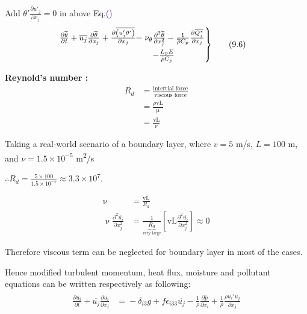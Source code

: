\documentclass[fleqn,10pt]{SelfArx} %
\newcommand{\myeqref}[1]{Eq.\textcolor{blue}{\textup{(\getrefnumber{#1})}}}
\begin{document}
Add $\overline{\theta'\frac{\partial u'_j}{\partial x_j}}=0$ in above \myeqref{eq:9.5}
\begin{align*}
	\begin{rcases}
		\frac{\partial \overline{\theta}}{\partial t} + \overline{u_j} \frac{\partial \overline{\theta}}{\partial x_j} + \frac{\partial \overline{\left(u_j' \theta'\right)}}{\partial x_j} & \!\!\!\!\!\! = \nu_{\theta} \frac{\partial^2 \overline{\theta}}{\partial x_j^2} - \frac{1}{\overline{\rho} C_p} \frac{\partial \overline{Q_j^*}}{\partial x_j} \\ &\quad - \frac{L_p E}{\overline{\rho} C_p}
	\end{rcases} & \tag{9.6} \label{eq:9.6}
\end{align*}

\textbf{Reynold's number :}
\begin{align*}
	R_d &= \frac{\text{intertial force}}{\text{viscous force}} \\
	    &= \frac{\rho \text{vL}}{\upmu} \\
	    &= \frac{\text{vL}}{\upnu}
\end{align*} 

Taking a real-world scenario of a boundary layer, where \( v = 5 \) m/s, \( L = 100 \) m, and \( \nu = 1.5 \times 10^{-5} \) m\textsuperscript{2}/s 

\(\therefore R_d = \frac{5 \times 100}{1.5 \times 10^{-5}} \approx 3.3 \times 10^7\).

\begin{align*}
	\upnu &= \frac{\text{vL}}{R_d} \\
	\upnu\frac{\partial^2 \overline{u_i}}{\partial x_j^2} &= \frac{1}{\underbrace{R_d}_{\text{very large}}}\left[\text{vL}\frac{\partial^2 \overline{u_i}}{\partial x_j^2}\right] \approx 0
\end{align*}

Therefore viscous term can be neglected for boundary layer in most of the cases.

Hence modified turbulent momentum, heat flux, moisture and pollutant equations can be written respectively as following:
\begin{align*}
	\frac{\partial \overline{u_i}}{\partial t} + \!\! \overline{u_j}\frac{\partial \overline{u_i}}{\partial x_j} \!\! &= \!\! -\delta_{i3}g \!\! + f\epsilon_{i33}\overline{u_j} \!\! - \frac{1}{\rho}\frac{\partial \overline{p}}{\partial x_i} \!\! + \frac{1}{\overline{\rho}}\frac{\overline{\rho u_i'u_j}}{\partial x_j} \tag{9.7} \label{eq:9.7}
\end{align*}
\end{document}

